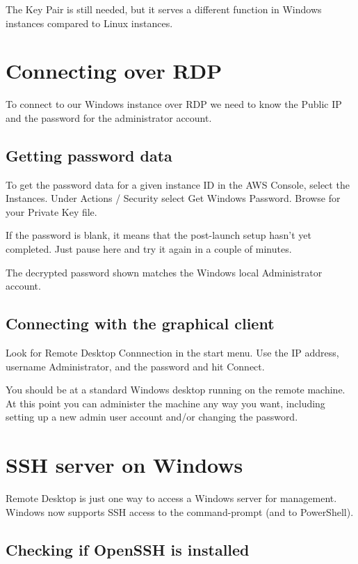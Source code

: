 The Key Pair is still needed, but it serves a different function in
Windows instances compared to Linux instances.


\section{Connecting over RDP}\label{connecting-over-rdp}

To connect to our Windows instance over RDP we need to know the Public
IP and the password for the administrator account.

\subsection{Getting password data}\label{getting-password-data}

To get the password data for a given instance ID in the AWS Console, select the Instances.
Under Actions / Security select Get Windows Password.
Browse for your Private Key file.

If the password is blank, it means that the post-launch setup hasn't yet
completed. Just pause here and try it again in a couple of minutes.

The decrypted password shown matches the Windows local Administrator
account.

\subsection{Connecting with the graphical client}
\label{sec:connecting-with-the-graphical-client}

Look for Remote Desktop Connnection in the start menu. Use the IP
address, username Administrator, and the password and hit Connect.

You should be at a standard Windows desktop running on the remote
machine. At this point you can administer the machine any way you want,
including setting up a new admin user account and/or changing the
password.

\section{SSH server on Windows}
\label{sec:ssh-server-on-windows}

Remote Desktop is just one way to access a Windows server for management.
Windows now supports SSH access to the command-prompt (and to PowerShell).

\subsection{Checking if OpenSSH is installed}
\label{checking-if-openssh-is-installed}

